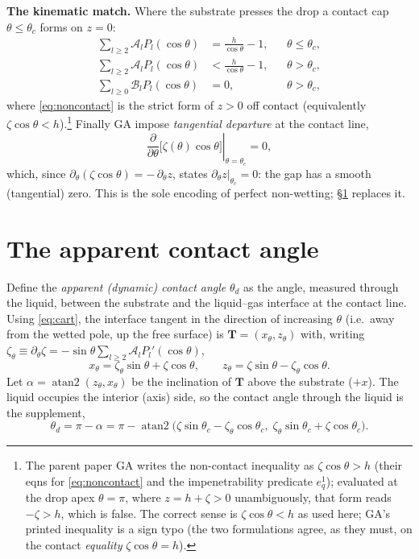 \documentclass{jfm}
\newcommand{\be}{\begin{equation}}
\newcommand{\ee}{\end{equation}}
\begin{document}
\medskip\noindent\textbf{The kinematic match.} Where the substrate presses the drop a
contact cap $\theta\le\theta_c$ forms on $z=0$:
\begin{align}
\sum_{l\ge2}\mathscr A_l P_l(\cos\theta) &= \frac{h}{\cos\theta}-1,
   &&\theta\le\theta_c, \label{eq:contact}\\
\sum_{l\ge2}\mathscr A_l P_l(\cos\theta) &< \frac{h}{\cos\theta}-1,
   &&\theta>\theta_c, \label{eq:noncontact}\\
\sum_{l\ge0}\mathscr B_l P_l(\cos\theta) &= 0,
   &&\theta>\theta_c, \label{eq:pzero}
\end{align}
where \eqref{eq:noncontact} is the strict form of $z>0$ off contact (equivalently
$\zeta\cos\theta<h$).\footnote{The parent paper GA writes the non-contact inequality as
$\zeta\cos\theta>h$ (their eqns for \eqref{eq:noncontact} and the impenetrability
predicate $e^1_q$); evaluated at the drop apex $\theta=\pi$, where $z=h+\zeta>0$
unambiguously, that form reads $-\zeta>h$, which is false. The correct sense is
$\zeta\cos\theta<h$ as used here; GA's printed inequality is a sign typo (the two
formulations agree, as they must, on the contact \emph{equality} $\zeta\cos\theta=h$).}
Finally GA impose \emph{tangential departure} at the contact line,
\be\label{eq:tangency}
\left.\frac{\partial}{\partial\theta}\Big[\zeta(\theta)\cos\theta\Big]\right|_{\theta=\theta_c}=0,
\ee
which, since $\partial_\theta(\zeta\cos\theta)=-\,\partial_\theta z$, states
$\partial_\theta z|_{\theta_c}=0$: the gap has a smooth (tangential) zero. This is the
sole encoding of perfect non-wetting; \S\ref{sec:angle} replaces it.

\section{The apparent contact angle}\label{sec:angle}

Define the \emph{apparent (dynamic) contact angle} $\theta_d$ as the angle, measured
through the liquid, between the substrate and the liquid--gas interface at the contact
line. Using \eqref{eq:cart}, the interface tangent in the direction of increasing
$\theta$ (i.e.\ away from the wetted pole, up the free surface) is
$\mathbf T=(x_\theta,z_\theta)$ with, writing
$\zeta_\theta\equiv\partial_\theta\zeta=-\sin\theta\sum_{l\ge2}\mathscr A_l P_l'(\cos\theta)$,
\be\label{eq:tangent}
x_\theta=\zeta_\theta\sin\theta+\zeta\cos\theta,\qquad
z_\theta=\zeta\sin\theta-\zeta_\theta\cos\theta .
\ee
Let $\alpha=\operatorname{atan2}(z_\theta,x_\theta)$ be the inclination of $\mathbf T$
above the substrate ($+x$). The liquid occupies the interior (axis) side, so the contact
angle through the liquid is the supplement,
\be\label{eq:thetad}
\boxed{\;\theta_d=\pi-\alpha
=\pi-\operatorname{atan2}\!\big(\zeta\sin\theta_c-\zeta_\theta\cos\theta_c,\;
\zeta_\theta\sin\theta_c+\zeta\cos\theta_c\big).\;}
\ee
\end{document}
